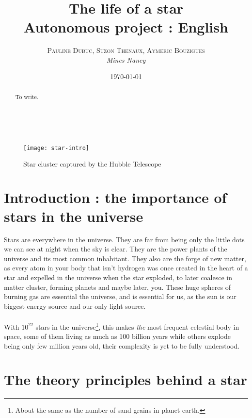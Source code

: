 \documentclass[a4paper, 11pt]{article} %
\title{\textbf{The life of a star}\\ %
Autonomous project : English} %
\author{\textsc{Pauline Dubuc, Suzon Thenaux, Aymeric Bouzigues} %
\\{\textit{Mines Nancy}}} %
\date{\today} %
\makeatletter
\renewcommand{\maketitle}{ %
\begin{flushright} %
{\LARGE\@title} %

\vspace{30pt} %

{\large\@author} %
\\\@date %

\vspace{20pt} %
\end{flushright}
}
\makeatother
\begin{document}
\maketitle %



\begin{abstract}
To write.
\end{abstract}


\begin{figure}[h]
\centering
\texttt{[image: star-intro]}
\captionsetup{labelformat=empty}
\caption{Star cluster captured by the Hubble Telescope}
\end{figure}
\newpage
\tableofcontents
\newpage
\section*{Introduction : the importance of stars in the universe}

Stars are everywhere in the universe. They are far from being only the little dots we can see at night when the sky is clear. They are the power plants of the universe and its most common inhabitant. They also are the forge of new matter, as every atom in your body that isn't hydrogen was once created in the heart of a star and expelled in the universe when the star exploded, to later coalesce in matter cluster, forming planets and maybe later, you.
These huge spheres of burning gas are essential the universe, and is essential for us, as the sun is our biggest energy source and our only light source. 

\paragraph*{}
With $10^{22}$ stars in the universe\footnote{About the same as the number of sand grains in planet earth.}, this makes \textit{the} most frequent celestial body in space, some of them living as much as 100 billion years while others explode being only few million years old, their complexity is yet to be fully understood.

\section{The theory principles behind a star}
\end{document}
